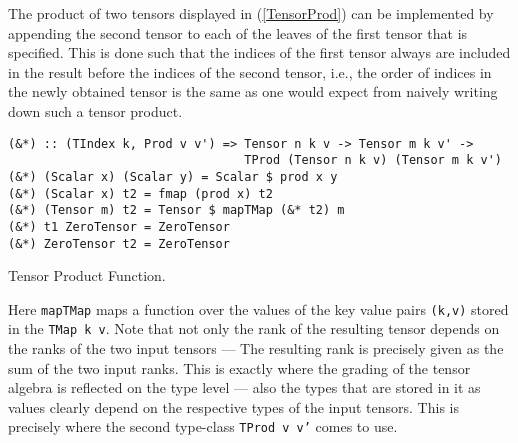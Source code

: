 The product of two tensors displayed in (\ref{TensorProd}) can be implemented by appending the second tensor to each of the leaves of the first tensor that is specified. This is done such that the indices of the first tensor always are included in the result before the indices of the second tensor, i.e., the order of indices in the newly obtained tensor is the same as one would expect from naively writing down such a tensor product.
\begin{listing}[hbt!]
\begin{verbatim}
(&*) :: (TIndex k, Prod v v') => Tensor n k v -> Tensor m k v' ->
                                 TProd (Tensor n k v) (Tensor m k v')
(&*) (Scalar x) (Scalar y) = Scalar $ prod x y
(&*) (Scalar x) t2 = fmap (prod x) t2
(&*) (Tensor m) t2 = Tensor $ mapTMap (&* t2) m
(&*) t1 ZeroTensor = ZeroTensor
(&*) ZeroTensor t2 = ZeroTensor
\end{verbatim}
\caption{Tensor Product Function.}\label{TensorProd}
\end{listing}
Here \texttt{mapTMap} maps a function over the values of the key value pairs \texttt{(k,v)} stored in the \texttt{TMap k v}.
Note that not only the rank of the resulting tensor depends on the ranks of the two input tensors --- The resulting rank is precisely given as the sum of the two input ranks. This is exactly where the grading of the tensor algebra is reflected on the type level --- also the types that are stored in it as values clearly depend on the respective types of the input tensors. This is precisely where the second type-class \texttt{TProd v v'} comes to use. 

